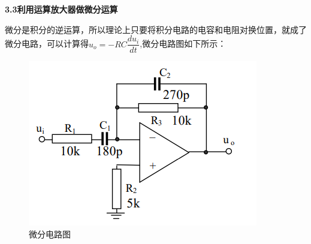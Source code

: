 \documentclass[a4 paper,12pt]{article}
\begin{document}
    \textbf{3.3\quad 利用运算放大器做微分运算}
        \par 微分是积分的逆运算，所以理论上只要将积分电路的电容和电阻对换位置，就成了微分电路，可以计算得$u_{o}=-RC\dfrac{du_{i}}{dt}$,微分电路图如下所示：
     		\begin{figure}[H]
     		\centering
     		\hspace{2em}\includegraphics[width=.5\linewidth]{pic/3.png}
     		\caption{\small{微分电路图}
     		}
     	\end{figure}
\end{document}
